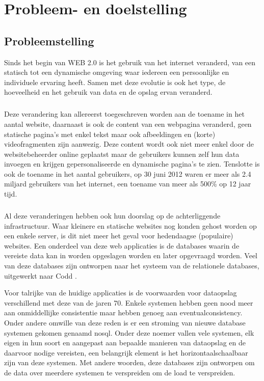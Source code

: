 \chapter{Probleem- en doelstelling}

\section{Probleemstelling}
Sinds het begin van WEB 2.0 is het gebruik van het internet veranderd, van een statisch tot een dynamische omgeving waar iedereen een persoonlijke en individuele ervaring heeft. Samen met deze evolutie is ook het type, de hoeveelheid en het gebruik van data en de opslag ervan veranderd. 

\paragraph{}
Deze verandering kan allereerst toegeschreven worden aan de toename in het aantal website, daarnaast is ook de content van een webpagina veranderd, geen statische pagina's met enkel tekst maar ook afbeeldingen en (korte) videofragmenten zijn aanwezig. Deze content wordt ook niet meer enkel door de websitebeheerder online geplaatst maar de gebruikers kunnen zelf hun data invoegen en krijgen gepersonaliseerde en dynamische pagina's te zien. 
Tenslotte is ook de toename in het aantal gebruikers, op 30 juni 2012 waren er meer als 2.4 miljard gebruikers van het internet, een toename van meer als 500\% op 12 jaar tijd.  
\cite{WorldInternetStatics}

\paragraph{}
Al deze veranderingen hebben ook hun doorslag op de achterliggende infrastructuur. Waar kleinere en statische websites nog konden gehost worden op een enkele server, is dit niet meer het geval voor hedendaagse (populaire) websites. 
Een onderdeel van deze web applicaties is de databases waarin de vereiste data kan in worden opgeslagen worden en later opgevraagd worden. Veel van deze databases zijn ontworpen naar het systeem van de relationele databases, uitgewerkt naar Codd \cite{Codd:1970:RMD:362384.362685}.

Voor talrijke van de huidige applicaties is de voorwaarden voor dataopslag verschillend met deze van de jaren 70. Enkele systemen hebben geen nood meer aan onmiddellijke consistentie maar hebben genoeg aan \gls{eventualconsistency}. Onder andere omwille van deze reden is er een stroming van nieuwe database systemen gekomen genaamd \gls{nosql}. Onder deze noemer vallen vele systemen, elk eigen in hun soort en aangepast aan bepaalde manieren van dataopslag en de daarvoor nodige vereisten, een belangrijk element is het \gls{horizontaalschaalbaar} zijn van deze systemen. Met andere woorden, deze databases zijn ontworpen om de data over meerdere systemen te verspreiden om de load te verspreiden. 

